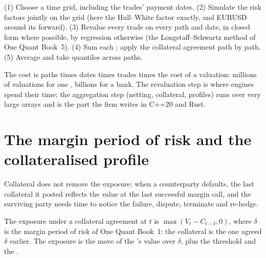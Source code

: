 \begin{method}\label{met:rc:counterparty-exposure:sim}
(1) Choose a time grid, including the trades' payment dates. (2) Simulate the risk
factors jointly on the grid (here the Hull--White factor exactly, and EURUSD around its
forward). (3) Revalue every trade on every path and date, in closed form where possible, by
regression otherwise (the Longstaff--Schwartz method of One Quant Book~5). (4) Sum each
; apply the collateral agreement path by path. (5) Average and take quantiles
across paths.
\end{method}

\label{lst:rc:counterparty-exposure:sim}

The cost is paths times dates times trades times the cost of a valuation: millions of
valuations for one , billions for a bank. The revaluation step is where
engines spend their time; the aggregation step (netting, collateral, profiles) runs over
very large arrays and is the part the firm writes in C++20 and Rust.

\section{The margin period of risk and the collateralised profile}

Collateral does not remove the exposure: when a counterparty defaults, the last collateral
it posted reflects the value at the last successful margin call, and the surviving party
needs time to notice the failure, dispute, terminate and re-hedge.

\begin{definition}\label{def:rc:counterparty-exposure:mpor}
The exposure under a collateral agreement at $t$ is $\max(V_t-C_{t-\delta},0)$, where $\delta$ is the
margin period of risk of One Quant Book~1: the collateral is the one agreed $\delta$ earlier.
The exposure is the move of the 's value over $\delta$, plus the threshold and the
.
\end{definition}

\label{lst:rc:counterparty-exposure:csa}

